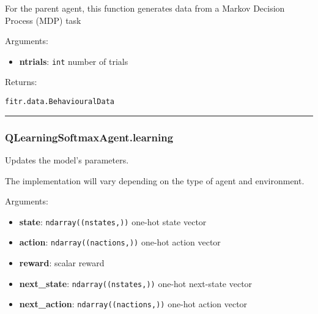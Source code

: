 \begin{Shaded}
\begin{Highlighting}[]
\end{Highlighting}
\end{Shaded}

For the parent agent, this function generates data from a Markov
Decision Process (MDP) task

Arguments:

\begin{itemize}
\tightlist
\item
  \textbf{ntrials}: \texttt{int} number of trials
\end{itemize}

Returns:

\texttt{fitr.data.BehaviouralData}

\begin{center}\rule{0.5\linewidth}{\linethickness}\end{center}

\hypertarget{qlearningsoftmaxagent.learning}{%
\subsubsection{QLearningSoftmaxAgent.learning}\label{qlearningsoftmaxagent.learning}}

\begin{Shaded}
\begin{Highlighting}[]
\end{Highlighting}
\end{Shaded}

Updates the model's parameters.

The implementation will vary depending on the type of agent and
environment.

Arguments:

\begin{itemize}
\tightlist
\item
  \textbf{state}: \texttt{ndarray((nstates,))} one-hot state vector
\item
  \textbf{action}: \texttt{ndarray((nactions,))} one-hot action vector
\item
  \textbf{reward}: scalar reward
\item
  \textbf{next\_state}: \texttt{ndarray((nstates,))} one-hot next-state
  vector
\item
  \textbf{next\_action}: \texttt{ndarray((nactions,))} one-hot action
  vector
\end{itemize}

